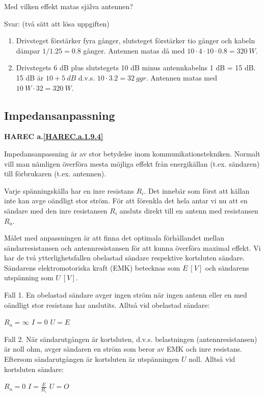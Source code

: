 Med vilken effekt matas själva antennen?

Svar: (två sätt att lösa uppgiften)
\begin{enumerate}
\item Drivsteget förstärker fyra gånger, slutsteget förstärker tio gånger och
kabeln dämpar \(1/1.25 = 0.8\) gånger. Antennen matas då med
\(10 \cdot 4 \cdot 10 \cdot 0.8 = 320\ W\).
\item Drivstegets 6 dB plus slutstegets 10 dB minus antennkabelns 1 dB = 15 dB.
15 dB är \(10 + 5\ dB\) d.v.s. \(10 \cdot 3.2 = 32\ ggr\). Antennen matas med
\(10\ W \cdot 32 = 320\ W\).
\end{enumerate}

\subsection{Impedansanpassning}
\textbf{HAREC a.\ref{HAREC.a.1.9.4}\label{myHAREC.a.1.9.4}}

Impedansanpassning är av stor betydelse inom kommunikationstekniken.
Normalt vill man nämligen överföra mesta möjliga effekt från energikällan
(t.ex. sändaren) till förbrukaren (t.ex. antennen).

Varje spänningskälla har en inre resistans \(R_i\). Det innebär som först att
källan inte kan avge oändligt stor ström. För att förenkla det hela antar vi nu
att en sändare med den inre resistansen \(R_i\) ansluts direkt till en antenn
med resistansen \(R_a\).

Målet med anpassningen är att finna det optimala förhållandet mellan
sändarresistansen och antennresistansen för att kunna överföra maximal effekt.
Vi har de två ytterlighetsfallen obelastad sändare respektive kortsluten
sändare. Sändarens elektromotoriska kraft (EMK) betecknas som \(E\ [V]\) och
sändarens utspänning som \(U\ [V]\).

Fall 1.
En obelastad sändare avger ingen ström när ingen antenn eller en med oändligt
stor resistans har anslutits.
Alltså vid obelastad sändare:

\(R_a = \infty\) \(I = 0\) \(U = E\)

Fall 2.
När sändarutgången är kortsluten, d.v.s. belastningen (antennresistansen) är
noll ohm, avger sändaren en ström som beror av EMK och inre resistans. Eftersom
sändarutgången är kortsluten är utspänningen \(U\) noll.
Alltså vid kortsluten sändare:

\(R_a = 0\) \(I = \frac{E}{R_i}\) \(U = O\)

